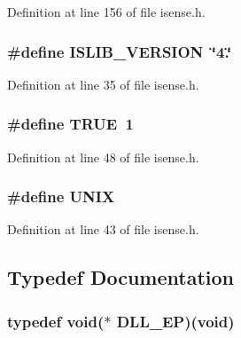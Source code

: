 \-Definition at line 156 of file isense.\-h.

\subsubsection[{\-I\-S\-L\-I\-B\-\_\-\-V\-E\-R\-S\-I\-O\-N}]{\setlength{\rightskip}{0pt plus 5cm}\#define {\bf \-I\-S\-L\-I\-B\-\_\-\-V\-E\-R\-S\-I\-O\-N}~\char`\"{}4.\char`\"{}}\label{isense_8h_a0bdeac363578ad33d7a5813777ee63f8}


\-Definition at line 35 of file isense.\-h.

\subsubsection[{\-T\-R\-U\-E}]{\setlength{\rightskip}{0pt plus 5cm}\#define {\bf \-T\-R\-U\-E}~1}\label{isense_8h_aa8cecfc5c5c054d2875c03e77b7be15d}


\-Definition at line 48 of file isense.\-h.

\subsubsection[{\-U\-N\-I\-X}]{\setlength{\rightskip}{0pt plus 5cm}\#define {\bf \-U\-N\-I\-X}}\label{isense_8h_a2dafe4a81445873e5c3cb0dff7741429}


\-Definition at line 43 of file isense.\-h.



\subsection{\-Typedef \-Documentation}
\subsubsection[{\-D\-L\-L\-\_\-\-E\-P}]{\setlength{\rightskip}{0pt plus 5cm}typedef void($\ast$  {\bf \-D\-L\-L\-\_\-\-E\-P})(void)}\label{isense_8h_a1c86f518e5c392fe19f47d94f5630713}


